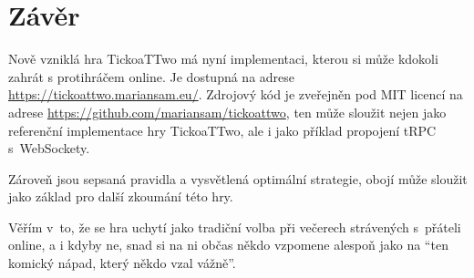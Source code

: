 \chapter*{Závěr}

Nově vzniklá hra TickoaTTwo má nyní implementaci, kterou si může kdokoli zahrát
s protihráčem online. Je dostupná na adrese \url{https://tickoattwo.mariansam.eu/}.
Zdrojový kód je zveřejněn pod MIT licencí na adrese
\url{https://github.com/mariansam/tickoattwo}, ten může sloužit nejen jako
referenční implementace hry TickoaTTwo, ale i jako příklad propojení tRPC
s~WebSockety.

Zároveň jsou sepsaná pravidla a vysvětlená optimální strategie, obojí může
sloužit jako základ pro další zkoumání této hry.

Věřím v~to, že se hra uchytí jako tradiční volba při večerech strávených
s~přáteli online, a i kdyby ne, snad si na ni občas někdo vzpomene alespoň jako
na \enquote{ten komický nápad, který někdo vzal vážně}.
